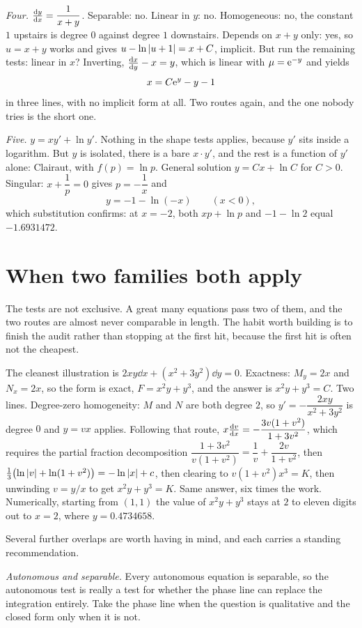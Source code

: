 \emph{Four.} $\frac{\mathrm{d}y}{\mathrm{d}x}=\dfrac{1}{x+y}$. Separable: no. Linear in $y$: no. Homogeneous: no, the constant $1$ upstairs is degree $0$ against degree $1$ downstairs. Depends on $x+y$ only: yes, so $u=x+y$ works and gives $u-\ln\left\lvert u+1\right\rvert=x+C$, implicit. But run the remaining tests: linear in $x$? Inverting, $\frac{\mathrm{d}x}{\mathrm{d}y}-x=y$, which is linear with $\mu=\mathrm{e}^{-y}$ and yields
\[x=C\mathrm{e}^{y}-y-1\]
in three lines, with no implicit form at all. Two routes again, and the one nobody tries is the short one.

\emph{Five.} $y=xy'+\ln y'$. Nothing in the shape tests applies, because $y'$ sits inside a logarithm. But $y$ is isolated, there is a bare $x\cdot y'$, and the rest is a function of $y'$ alone: Clairaut, with $f(p)=\ln p$. General solution $y=Cx+\ln C$ for $C>0$. Singular: $x+\dfrac1p=0$ gives $p=-\dfrac1x$ and
\[y=-1-\ln(-x)\qquad (x<0),\]
which substitution confirms: at $x=-2$, both $xp+\ln p$ and $-1-\ln2$ equal $-1.6931472$.

\section{When two families both apply}

The tests are not exclusive. A great many equations pass two of them, and the two routes are almost never comparable in length. The habit worth building is to finish the audit rather than stopping at the first hit, because the first hit is often not the cheapest.

The cleanest illustration is $2xy\dd x+(x^{2}+3y^{2})\dd y=0$. Exactness: $M_y=2x$ and $N_x=2x$, so the form is exact, $F=x^{2}y+y^{3}$, and the answer is $x^{2}y+y^{3}=C$. Two lines. Degree-zero homogeneity: $M$ and $N$ are both degree $2$, so $y'=-\dfrac{2xy}{x^{2}+3y^{2}}$ is degree $0$ and $y=vx$ applies. Following that route, $x\frac{\mathrm{d}v}{\mathrm{d}x}=-\dfrac{3v(1+v^{2})}{1+3v^{2}}$, which requires the partial fraction decomposition $\dfrac{1+3v^{2}}{v(1+v^{2})}=\dfrac1v+\dfrac{2v}{1+v^{2}}$, then $\tfrac13\bigl(\ln\left\lvert v\right\rvert+\ln(1+v^{2})\bigr)=-\ln\left\lvert x\right\rvert+c$, then clearing to $v(1+v^{2})x^{3}=K$, then unwinding $v=y/x$ to get $x^{2}y+y^{3}=K$. Same answer, six times the work. Numerically, starting from $(1,1)$ the value of $x^{2}y+y^{3}$ stays at $2$ to eleven digits out to $x=2$, where $y=0.4734658$.

Several further overlaps are worth having in mind, and each carries a standing recommendation.

\emph{Autonomous and separable.} Every autonomous equation is separable, so the autonomous test is really a test for whether the phase line can replace the integration entirely. Take the phase line when the question is qualitative and the closed form only when it is not.

